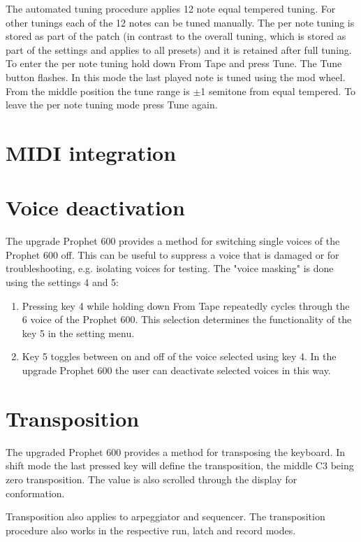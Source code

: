 \documentclass[draft,landscape, 11pt, oneside]{report}
\newenvironment{flowtext}{\addmargin[0cm]{7cm}}{\endaddmargin} %
\begin{document}
\begin{flowtext}
The automated tuning procedure applies 12 note equal tempered tuning. For other tunings each of the 12 notes can be tuned manually. The per note tuning is stored as part of the patch (in contrast to the overall tuning, which is stored as part of the settings and applies to all presets) and it is retained after full tuning. To enter the per note tuning hold down From Tape and press Tune. The Tune button flashes. In this mode the last played note is tuned using the mod wheel. From the middle position the tune range is $\pm$1 semitone from equal tempered. To leave the per note tuning mode press Tune again.

\section{MIDI integration}\label{midiintegration}



\section{Voice deactivation}

The upgrade Prophet 600 provides a method for switching single voices of the Prophet 600 off. This can be useful to suppress a voice that is damaged or for troubleshooting, e.g. isolating voices for testing. The "voice masking" is done using the settings 4 and 5:
\begin{enumerate}
  \setlength\itemsep{0cm}
  \item Pressing key 4 while holding down From Tape repeatedly cycles through the 6 voice of the Prophet 600. This selection determines the functionality of the key 5 in the setting menu.
  \item Key 5 toggles between on and off of the voice selected using key 4. In the upgrade Prophet 600 the user can deactivate selected voices in this way.
\end{enumerate}

\section{Transposition}

The upgraded Prophet 600 provides a method for transposing the keyboard. In shift mode the last pressed key will define the transposition, the middle C3 being zero transposition. The value is also scrolled through the display for conformation. 

Transposition also applies to arpeggiator and sequencer. The transposition procedure also works in the respective run, latch and record modes.


\end{flowtext}
\end{document}
